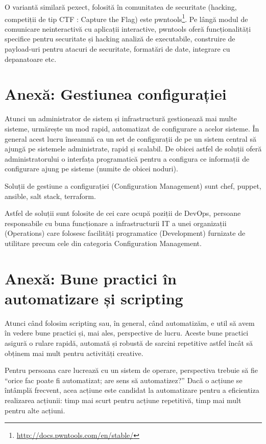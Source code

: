 O variantă similară pexect, folosită în comunitatea de securitate (hacking,
competiții de tip CTF : Capture the Flag) este
pwntools\footnote{\url{http://docs.pwntools.com/en/stable/}}. Pe lângă modul de
comunicare neinteractivă cu aplicații interactive, pwntools oferă
funcționalități specifice pentru securitate și hacking analiză de executabile,
construire de payload-uri pentru atacuri de securitate, formatări de date,
integrare cu depanatoare etc.

\section{Anexă: Gestiunea configurației}
\label{sec:auto-conf}

Atunci un administrator de sistem și infrastructură gestionează mai multe
sisteme, urmărește un mod rapid, automatizat de configurare a acelor sisteme. În
general acest lucru înseamnă ca un set de configurații de pe un sistem central
să ajungă pe sistemele administrate, rapid și scalabil. De obicei astfel de
soluții oferă administratorului o interfața programatică pentru a configura ce
informații de configurare ajung pe sisteme (numite de obicei noduri).

Soluții de gestiune a configurației (Configuration Management) sunt chef,
puppet, ansible, salt stack, terraform.

Astfel de soluții sunt folosite de cei care ocupă poziții de DevOps, persoane
responsabile cu buna funcționare a infrastructurii IT a unei organizații
(Operations) care folosesc facilități programatice (Development) furnizate de
utilitare precum cele din categoria Configuration Management.

\section{Anexă: Bune practici în automatizare și scripting}
\label{sec:auto-good}

Atunci când folosim scripting sau, în general, când automatizăm, e util să avem
în vedere bune practici și, mai ales, perspective de lucru. Aceste bune practici
asigură o rulare rapidă, automată și robustă de sarcini repetitive astfel încât
să obținem mai mult pentru activități creative.

Pentru persoana care lucrează cu un sistem de operare, perspectiva trebuie să
fie “orice fac poate fi automatizat; are sens să automatizez?” Dacă o acțiune se
întâmplă frecvent, acea acțiune este candidat la automatizare pentru a
eficientiza realizarea acțiunii: timp mai scurt pentru acțiune repetitivă, timp
mai mult pentru alte acțiuni.

